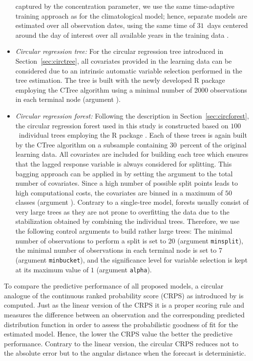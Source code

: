 \documentclass[nojss,shortnames]{jss}
\numberwithin{equation}{section}
\begin{document}
\begin{itemize}
    captured by the concentration parameter, we use the same time-adaptive
    training approach as for the climatological model; hence, separate models are
    estimated over all observation dates, using the same time of $31$~days
    centered around the day of interest over all available years in the training
    data \citep{Lang+Lerch+Mayr:2019}.
  \item \emph{Circular regression tree:}
    For the circular regression tree introduced in Section~\ref{sec:circtree},
    all covariates provided in the learning data can be considered due to an
    intrinsic automatic variable selection performed in the tree estimation. The
    tree is built with the newly developed \textsf{R} package  employing the
    CTree algorithm \citep{Hothorn+Hornik+Zeileis:2006} using a minimal number of
    2000 observations in each terminal node (argument ).
  \item \emph{Circular regression forest:} Following the description in
    Section~\ref{sec:circforest}, the circular regression forest used in this study is
    constructed based on $100$~individual trees employing the \textsf{R} package
    . Each of these trees is again built by the CTree algorithm on a
    subsample containing $30$~percent of the original learning data. All
    covariates are included for building each tree which ensures that the lagged
    response variable is always considered for splitting. This bagging approach can
    be applied in  by setting the argument  to the total
    number of covariates. Since a high number of possible split points leads to
    high computational costs, the covariates are binned in a maximum of $50$
    classes (argument ). Contrary to a
    single-tree model, forests usually consist of very large trees as they are not
    prone to overfitting the data due to the stabilization obtained by combining
    the individual trees. Therefore, we use the following control arguments to
    build rather large trees: The minimal number of observations to perform a split
    is set to 20 (argument \texttt{minsplit}), the minimal number of observations
    in each terminal node is set to 7 (argument \texttt{minbucket}), and the
    significance level for variable selection is kept at its maximum value of $1$
    (argument \texttt{alpha}).
\end{itemize}

To compare the predictive performance of all proposed models, a circular
analogue of the continuous ranked probability score (CRPS) as introduced by
\cite{Grimit+Gneiting+Berrocal:2006} is computed. Just as the linear version of
the CRPS \citep[for more details see][]{Hersbach:2000} it is a proper scoring
rule \citep{Gneiting+Raftery:2007} and measures the difference between an
observation and the corresponding predicted distribution function in order to
assess the probabilistic goodness of fit for the estimated model. Hence, the
lower the CRPS value the better the predictive performance. Contrary to the
linear version, the circular CRPS reduces not to the absolute error but to the
angular distance when the forecast is deterministic.
\end{document}
